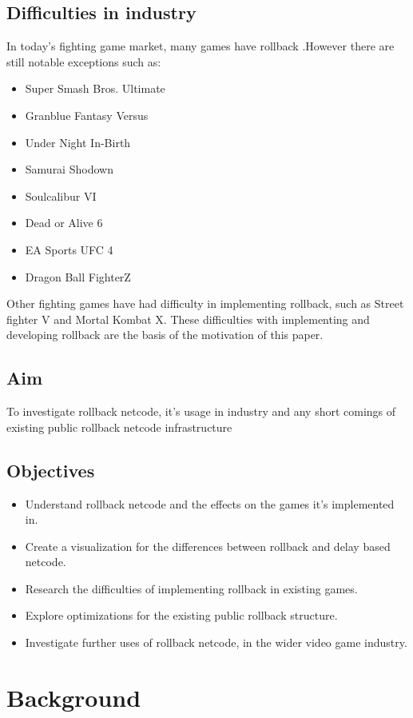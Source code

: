 \documentclass{entcs}
\begin{document}
\subsection{Difficulties in industry}
In today's fighting game market, many games have rollback \cite{GamesWithRollback}.However there are still notable exceptions such as:
\begin{itemize}
\item Super Smash Bros. Ultimate\cite{SSBU}
\item Granblue Fantasy Versus\cite{GBFV}
\item Under Night In-Birth\cite{UNI}
\item Samurai Shodown\cite{SamSho}
\item Soulcalibur VI\cite{SVI}
\item Dead or Alive 6\cite{DOA6}
\item EA Sports UFC 4\cite{UFC4}
\item Dragon Ball FighterZ\cite{DBFZ}
\end{itemize}

Other fighting games have had difficulty in implementing rollback, such as Street fighter V and Mortal Kombat X.
These difficulties with implementing and developing rollback are the basis of the motivation of this paper.

\subsection{Aim}
To investigate rollback netcode, it's usage in industry and any short comings of existing public rollback netcode infrastructure
\subsection{Objectives}
\begin{itemize}
\item Understand rollback netcode and the effects on the games it's implemented in.
\item Create a visualization for the differences between rollback and delay based netcode.
\item Research the difficulties of implementing rollback in existing games.
\item Explore optimizations for the existing public rollback structure.
\item Investigate further uses of rollback netcode, in the wider video game industry.
\end{itemize}
\newpage
\section{Background}
\end{document}
